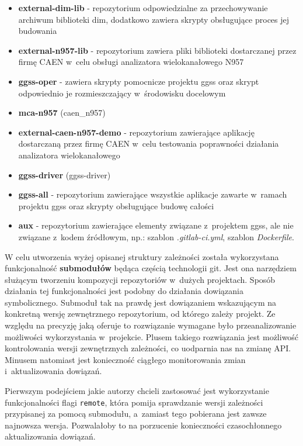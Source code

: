 \begin{itemize}
\item \color{orangei} \textbf{external-dim-lib} \color{black} - repozytorium odpowiedzialne za przechowywanie archiwum biblioteki \gls*{dim}, dodatkowo zawiera skrypty obsługujące proces jej budowania
\item \color{orangei} \textbf{external-n957-lib} \color{black} - repozytorium zawiera pliki biblioteki dostarczanej przez firmę CAEN w~celu obsługi analizatora wielokanałowego N957
\item \color{orangei} \textbf{ggss-oper} \color{black} - zawiera skrypty pomocnicze projektu \gls*{ggss} oraz skrypt odpowiednio je rozmieszczający w~środowisku docelowym
\item \textbf{mca-n957} (caen\_n957)
\item \color{orangei} \textbf{external-caen-n957-demo} \color{black} - repozytorium zawierające aplikację dostarczaną przez firmę CAEN w~celu testowania poprawności działania analizatora wielokanałowego
\item \textbf{ggss-driver} (ggss-driver)
\item \color{orangei} \textbf{ggss-all} \color{black} - repozytorium zawierające wszystkie aplikacje zawarte w~ramach projektu \gls*{ggss} oraz skrypty obsługujące budowę całości
\item \color{orangei} \textbf{aux} \color{black} - repozytorium zawierające elementy związane z~projektem \gls*{ggss}, ale nie związane z~kodem źródłowym, np.: szablon \textit{.gitlab-ci.yml}, szablon \textit{Dockerfile}.
\end{itemize}

\newpage

W celu utworzenia wyżej opisanej struktury zależności została wykorzystana funkcjonalność \textbf{submodułów} będąca częścią technologii \gls*{git}. Jest ona narzędziem służącym tworzeniu kompozycji repozytoriów w~dużych projektach. Sposób działania tej funkcjonalności jest podobny do działania dowiązania symbolicznego. Submoduł tak na prawdę jest dowiązaniem wskazującym na konkretną wersję zewnętrznego repozytorium, od którego zależy projekt. Ze względu na precyzję jaką oferuje to rozwiązanie wymagane było przeanalizowanie możliwości wykorzystania w~projekcie. Plusem takiego rozwiązania jest możliwość kontrolowania wersji zewnętrznych zależności, co uodparnia nas na zmianę API. Minusem natomiast jest konieczność ciągłego monitorowania zmian i~aktualizowania dowiązań.

Pierwszym podejściem jakie autorzy chcieli zastosować jest wykorzystanie funkcjonalności flagi \lstinline{remote}, która pomija sprawdzanie wersji zależności przypisanej za pomocą submodułu, a~zamiast tego pobierana jest zawsze najnowsza wersja. Pozwalałoby to na porzucenie konieczności czasochłonnego aktualizowania dowiązań. 

